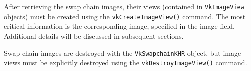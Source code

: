 After retrieving the swap chain images, their views (contained in \texttt{VkImageView} objects) must be created using the \texttt{vkCreateImageView()} command. 
The most critical information is the corresponding image, specified in the image field. Additional details will be discussed in subsequent sections.

Swap chain images are destroyed with the \texttt{VkSwapchainKHR} object, but image views must be explicitly destroyed using the \texttt{vkDestroyImageView()} command.